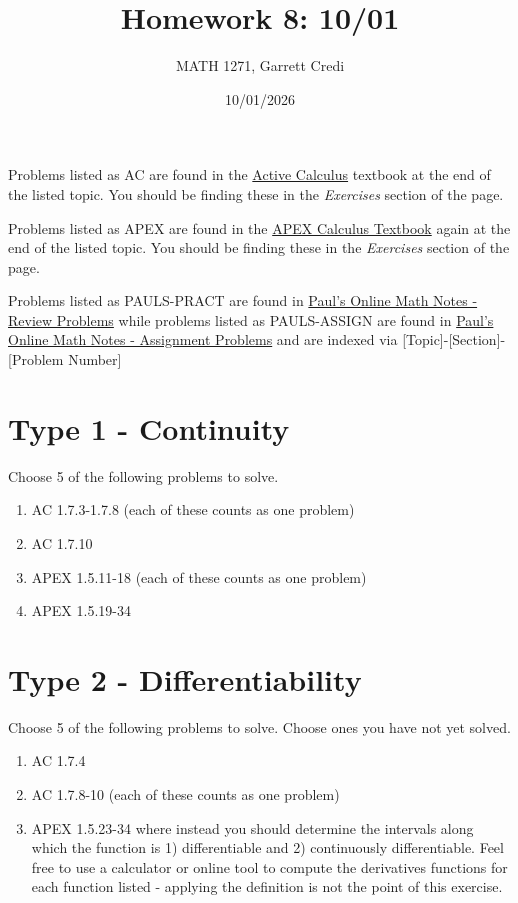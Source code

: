\documentclass[12pt]{article}
\title{Homework 8: 10/01}
\author{MATH 1271, Garrett Credi}
\date{10/01/2026}
\begin{document}
\maketitle

Problems listed as AC are found in the \href{https://activecalculus.org/single1e/frontmatter.html}{Active Calculus} 
textbook at the end of the listed topic. You should be finding these in the \textit{Exercises} section of the page.

Problems listed as APEX are found in the \href{https://opentext.uleth.ca/apex-calculus/apex-calculus.html}{APEX Calculus Textbook}
again at the end of the listed topic. You should be finding these in the \textit{Exercises} section of the page.

Problems listed as PAULS-PRACT are found in \href{https://tutorial.math.lamar.edu/Problems/CalcI/CalcI.aspx}{Paul's Online Math Notes - Review Problems}
while problems listed as PAULS-ASSIGN are found in \href{https://tutorial.math.lamar.edu/ProblemsNS/CalcI/CalcI.aspx}{Paul's Online Math Notes - Assignment Problems}
and are indexed via [Topic]-[Section]-[Problem Number]

\section{Type 1 - Continuity}
Choose 5 of the following problems to solve.

\begin{enumerate}
  \item AC 1.7.3-1.7.8 (each of these counts as one problem)
  \item AC 1.7.10
  \item APEX 1.5.11-18 (each of these counts as one problem)
  \item APEX 1.5.19-34
\end{enumerate}

\section{Type 2 - Differentiability}
Choose 5 of the following problems to solve. Choose ones you have not yet solved.

\begin{enumerate}
  \item AC 1.7.4
  \item AC 1.7.8-10 (each of these counts as one problem)
  \item APEX 1.5.23-34 where instead you should determine the intervals along which the function is 1) differentiable and 2) continuously differentiable. Feel free to use a calculator or online tool to compute the derivatives functions for each function listed - applying the definition is not the point of this exercise.
\end{enumerate}
\end{document}
